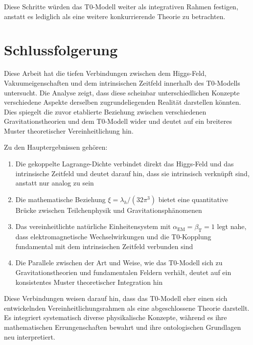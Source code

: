 \documentclass[12pt,a4paper]{article}
\newcommand{\alphaEM}{\alpha_{\text{EM}}}
\newcommand{\betaT}{\beta_{\text{T}}}
\begin{document}
	Diese Schritte würden das T0-Modell weiter als integrativen Rahmen festigen, anstatt es lediglich als eine weitere konkurrierende Theorie zu betrachten.
	
	\section{Schlussfolgerung}
	\label{sec:conclusion}
	
	Diese Arbeit hat die tiefen Verbindungen zwischen dem Higgs-Feld, Vakuumeigenschaften und dem intrinsischen Zeitfeld innerhalb des T0-Modells untersucht. Die Analyse zeigt, dass diese scheinbar unterschiedlichen Konzepte verschiedene Aspekte derselben zugrundeliegenden Realität darstellen könnten. Dies spiegelt die zuvor etablierte Beziehung zwischen verschiedenen Gravitationstheorien und dem T0-Modell wider und deutet auf ein breiteres Muster theoretischer Vereinheitlichung hin.
	
	Zu den Hauptergebnissen gehören:
	
	\begin{enumerate}
		\item Die gekoppelte Lagrange-Dichte verbindet direkt das Higgs-Feld und das intrinsische Zeitfeld und deutet darauf hin, dass sie intrinsisch verknüpft sind, anstatt nur analog zu sein
		
		\item Die mathematische Beziehung $\xi = \lambda_h/(32\pi^3)$ bietet eine quantitative Brücke zwischen Teilchenphysik und Gravitationsphänomenen
		
		\item Das vereinheitlichte natürliche Einheitensystem mit $\alphaEM = \betaT = 1$ legt nahe, dass elektromagnetische Wechselwirkungen und die T0-Kopplung fundamental mit dem intrinsischen Zeitfeld verbunden sind
		
		\item Die Parallele zwischen der Art und Weise, wie das T0-Modell sich zu Gravitationstheorien und fundamentalen Feldern verhält, deutet auf ein konsistentes Muster theoretischer Integration hin
	\end{enumerate}
	
	Diese Verbindungen weisen darauf hin, dass das T0-Modell eher einen sich entwickelnden Vereinheitlichungsrahmen als eine abgeschlossene Theorie darstellt. Es integriert systematisch diverse physikalische Konzepte, während es ihre mathematischen Errungenschaften bewahrt und ihre ontologischen Grundlagen neu interpretiert.
	
\end{document}

